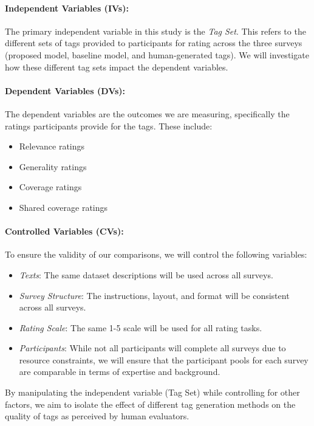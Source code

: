 \paragraph{Independent Variables (IVs):}
The primary independent variable in this study is the \textit{Tag Set}. This refers to the different sets of tags provided to participants for rating across the three surveys (proposed model, baseline model, and human-generated tags). We will investigate how these different tag sets impact the dependent variables.

\paragraph{Dependent Variables (DVs):}
The dependent variables are the outcomes we are measuring, specifically the ratings participants provide for the tags. These include:
\begin{itemize}
\item Relevance ratings
\item Generality ratings
\item Coverage ratings
\item Shared coverage ratings
\end{itemize}

\paragraph{Controlled Variables (CVs):}
To ensure the validity of our comparisons, we will control the following variables:
\begin{itemize}
\item \textit{Texts}: The same dataset descriptions will be used across all surveys.
\item \textit{Survey Structure}: The instructions, layout, and format will be consistent across all surveys.
\item \textit{Rating Scale}: The same 1-5 scale will be used for all rating tasks.
\item \textit{Participants}: While not all participants will complete all surveys due to resource constraints, we will ensure that the participant pools for each survey are comparable in terms of expertise and background.
\end{itemize}

By manipulating the independent variable (Tag Set) while controlling for other factors, we aim to isolate the effect of different tag generation methods on the quality of tags as perceived by human evaluators.

